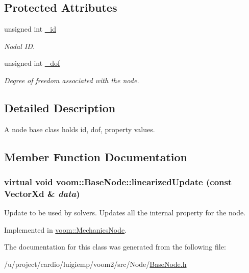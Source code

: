 \subsection*{Protected Attributes}
\begin{DoxyCompactItemize}
\item 
\hypertarget{classvoom_1_1_base_node_a8681fcdb44184fa22d54c14403b0716a}{
unsigned int \hyperlink{classvoom_1_1_base_node_a8681fcdb44184fa22d54c14403b0716a}{\_\-id}}
\label{classvoom_1_1_base_node_a8681fcdb44184fa22d54c14403b0716a}

\begin{DoxyCompactList}\small\item\em Nodal ID. \item\end{DoxyCompactList}\item 
\hypertarget{classvoom_1_1_base_node_ac0bca38f9ad3d54960ec7d0776ec71c4}{
unsigned int \hyperlink{classvoom_1_1_base_node_ac0bca38f9ad3d54960ec7d0776ec71c4}{\_\-dof}}
\label{classvoom_1_1_base_node_ac0bca38f9ad3d54960ec7d0776ec71c4}

\begin{DoxyCompactList}\small\item\em Degree of freedom associated with the node. \item\end{DoxyCompactList}\end{DoxyCompactItemize}


\subsection{Detailed Description}
A node base class holds id, dof, property values. 

\subsection{Member Function Documentation}
\hypertarget{classvoom_1_1_base_node_a27a440cc623e936472f5052f2731d32f}{
\subsubsection[{linearizedUpdate}]{\setlength{\rightskip}{0pt plus 5cm}virtual void voom::BaseNode::linearizedUpdate (const VectorXd \& {\em data})}}
\label{classvoom_1_1_base_node_a27a440cc623e936472f5052f2731d32f}
Update to be used by solvers. Updates all the internal property for the node. 

Implemented in \hyperlink{classvoom_1_1_mechanics_node_aa533aac405cd9f4b8b024ad070f18aff}{voom::MechanicsNode}.

The documentation for this class was generated from the following file:\begin{DoxyCompactItemize}
\item 
/u/project/cardio/luigiemp/voom2/src/Node/\hyperlink{_base_node_8h}{BaseNode.h}\end{DoxyCompactItemize}
